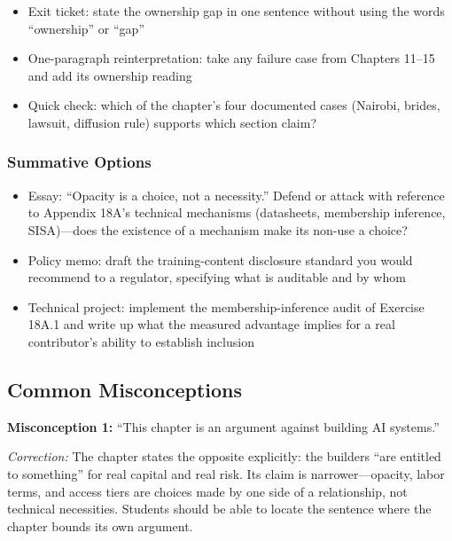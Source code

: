 \begin{itemize}
    \item Exit ticket: state the ownership gap in one sentence without using the words ``ownership'' or ``gap''
    \item One-paragraph reinterpretation: take any failure case from Chapters 11--15 and add its ownership reading
    \item Quick check: which of the chapter's four documented cases (Nairobi, brides, lawsuit, diffusion rule) supports which section claim?
\end{itemize}

\subsubsection*{Summative Options}

\begin{itemize}
    \item Essay: ``Opacity is a choice, not a necessity.'' Defend or attack with reference to Appendix 18A's technical mechanisms (datasheets, membership inference, SISA)---does the existence of a mechanism make its non-use a choice?
    \item Policy memo: draft the training-content disclosure standard you would recommend to a regulator, specifying what is auditable and by whom
    \item Technical project: implement the membership-inference audit of Exercise 18A.1 and write up what the measured advantage implies for a real contributor's ability to establish inclusion
\end{itemize}

\subsection*{Common Misconceptions}

\textbf{Misconception 1:} ``This chapter is an argument against building AI systems.''

\textit{Correction:} The chapter states the opposite explicitly: the builders ``are entitled to something'' for real capital and real risk. Its claim is narrower---opacity, labor terms, and access tiers are choices made by one side of a relationship, not technical necessities. Students should be able to locate the sentence where the chapter bounds its own argument.

